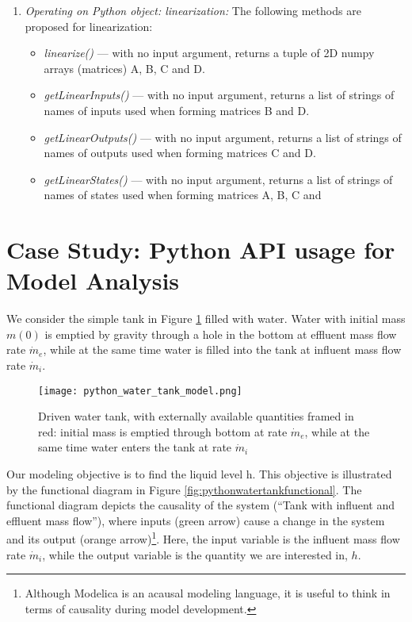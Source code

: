 \begin{enumerate}
	\item \textit{Operating on Python object: linearization:} The following methods are proposed for linearization:
	\begin{itemize}
		\item \textit{linearize()} — with no input argument, returns a tuple of 2D numpy arrays (matrices) A, B, C and D.
		\item \textit{getLinearInputs()} — with no input argument, returns a list of strings of names of inputs used when forming matrices B and D.
		\item \textit{getLinearOutputs()} — with no input argument, returns a list of strings of names of outputs used when forming matrices C and D.
		\item \textit{getLinearStates()} — with no input argument, returns a list of strings of names of states used when forming matrices A, B, C and
	\end{itemize}
\end{enumerate}

\section{Case Study: Python API usage for Model Analysis}
\label{subsec:pythoncasestudy}

We consider the simple tank in Figure \ref{fig:pythonwatertankmodel} filled with water. Water with initial mass $m(0)$ is emptied by gravity
through a hole in the bottom at effluent mass flow rate $\dot{m}_e$, while at the same time water is filled into the tank at influent mass flow rate $\dot{m}_i$.

\clearpage
\begin{figure} [!h]
	\centering
	\texttt{[image: python\_water\_tank\_model.png]}
	\caption{Driven water tank, with externally available quantities framed	in red: initial mass is emptied through bottom at rate $\dot{m}_e $, while at the same time water enters the tank at rate $\dot{m}_i$ }
	\label{fig:pythonwatertankmodel}
\end{figure}

Our modeling objective is to find the liquid level h. This objective is illustrated by the functional diagram in
Figure \ref{fig:pythonwatertankfunctional}. The functional diagram depicts the causality of the system (“Tank with influent and effluent mass flow”), where inputs (green arrow) cause a change in the system and its output (orange arrow)\footnote{Although Modelica is an acausal modeling language, it is useful to think in terms of causality during model development.}. Here, the input variable is the influent mass flow rate $\dot{m}_i$, while the output variable is the quantity we are interested in, $h$.

